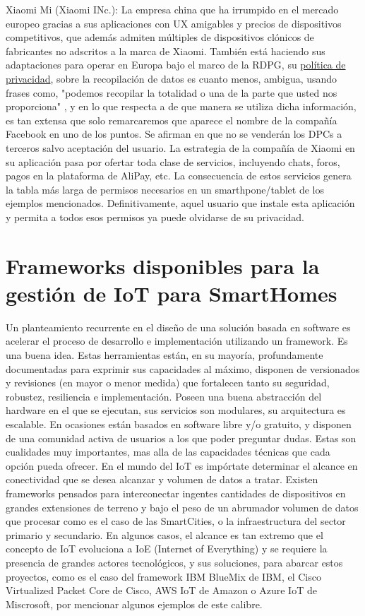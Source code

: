 Xiaomi Mi (Xiaomi INc.): La empresa china que ha irrumpido en el mercado europeo gracias a sus aplicaciones con UX amigables y precios de dispositivos competitivos, que además admiten múltiples de dispositivos clónicos de fabricantes no adscritos a la marca de Xiaomi. También está haciendo sus adaptaciones para operar en Europa bajo el marco de la RDPG, su \href{https://www.mi.com/es/about/privacy}{política de privacidad}, sobre la recopilación de datos es cuanto menos, ambigua, usando frases como, "podemos recopilar la totalidad o una de la parte que usted nos proporciona" , y en lo que respecta a de que manera se utiliza dicha información, es tan extensa que solo remarcaremos que aparece el nombre de la compañía Facebook en uno de los puntos. Se afirman en que no se venderán los DPCs a terceros salvo aceptación del usuario. La estrategia de la compañía de Xiaomi en su aplicación pasa por ofertar toda clase de servicios, incluyendo chats, foros, pagos en la plataforma de AliPay, etc. La consecuencia de estos servicios genera la tabla más larga de permisos necesarios en un smarthpone/tablet de los ejemplos mencionados. Definitivamente, aquel usuario que instale esta aplicación y permita a todos esos permisos ya puede olvidarse de su privacidad.

\section{Frameworks disponibles para la gestión de IoT para SmartHomes}
\label{ch:Capitulo2.2}

Un planteamiento recurrente en el diseño de una solución basada en software es acelerar el proceso de desarrollo e implementación utilizando un framework. Es una buena idea. Estas herramientas están, en su mayoría, profundamente documentadas para exprimir sus capacidades al máximo, disponen de versionados y revisiones (en mayor o menor medida) que fortalecen tanto su seguridad, robustez, resiliencia e implementación. Poseen una buena abstracción del hardware en el que se ejecutan, sus servicios son modulares, su arquitectura es escalable.  En ocasiones están basados en software libre y/o gratuito, y disponen de una comunidad activa de usuarios a los que poder preguntar dudas. Estas son cualidades muy importantes, mas alla de las capacidades técnicas que cada opción pueda ofrecer.
En el mundo del IoT es impórtate determinar el alcance en conectividad que se desea alcanzar y volumen de datos a tratar. Existen frameworks pensados para interconectar ingentes cantidades de dispositivos en grandes extensiones de terreno y bajo el peso de un abrumador volumen de datos que procesar como es el caso de las SmartCities, o la infraestructura del sector primario y secundario. En algunos casos, el alcance es tan extremo que el concepto de IoT evoluciona a IoE (Internet of Everything) y se requiere la presencia de grandes actores tecnológicos, y sus soluciones, para abarcar estos proyectos, como es el caso del framework IBM BlueMix de IBM, el Cisco Virtualized Packet Core de Cisco, AWS IoT de Amazon o Azure IoT de Miscrosoft, por mencionar algunos ejemplos de este calibre.

